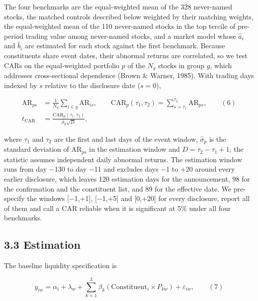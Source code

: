 \documentclass[review,authoryear,12pt]{elsarticle}
\begin{document}
The four benchmarks are the equal-weighted mean of the 328 never-named
stocks, the matched controls described below weighted by their matching
weights, the equal-weighted mean of the 110 never-named stocks in the
top tercile of pre-period trading value among never-named stocks, and a
market model whose \(\hat a_i\) and \(\hat b_i\) are estimated for each
stock against the first benchmark. Because constituents share event
dates, their abnormal returns are correlated, so we test CARs on the
equal-weighted portfolio \(p\) of the \(N_g\) stocks in group \(g\),
which addresses cross-sectional dependence (Brown \& Warner, 1985). With
trading days indexed by \(s\) relative to the disclosure date
(\(s = 0\)),

\[\begin{aligned} \mathrm{AR}_{ps} &= \frac{1}{N_g}\sum_{i \in g}\mathrm{AR}_{is}, \qquad \mathrm{CAR}_p(\tau_1, \tau_2) = \sum_{s=\tau_1}^{\tau_2}\mathrm{AR}_{ps}, \qquad (6) \\ t_{\mathrm{CAR}} &= \frac{\mathrm{CAR}_p(\tau_1, \tau_2)}{\hat\sigma_p\sqrt{D}}, \end{aligned}\]

where \(\tau_1\) and \(\tau_2\) are the first and last days of the event
window, \(\hat\sigma_p\) is the standard deviation of
\(\mathrm{AR}_{ps}\) in the estimation window and
\(D = \tau_2 - \tau_1 + 1\); the statistic assumes independent daily
abnormal returns. The estimation window runs from day −130 to day −11
and excludes days −1 to +20 around every earlier disclosure, which
leaves 120 estimation days for the announcement, 98 for the confirmation
and the constituent list, and 89 for the effective date. We pre-specify
the windows {[}−1,+1{]}, {[}−1,+5{]} and {[}0,+20{]} for every
disclosure, report all of them and call a CAR reliable when it is
significant at 5\% under all four benchmarks.

\hypertarget{estimation}{%
\subsection*{3.3 Estimation}}

The baseline liquidity specification is

\[y_{iw} = \alpha_i + \lambda_w + \sum_{k=1}^{3}\beta_k\left(\mathrm{Constituent}_i \times P_{kw}\right) + \varepsilon_{iw}, \qquad (7)\]
\end{document}
